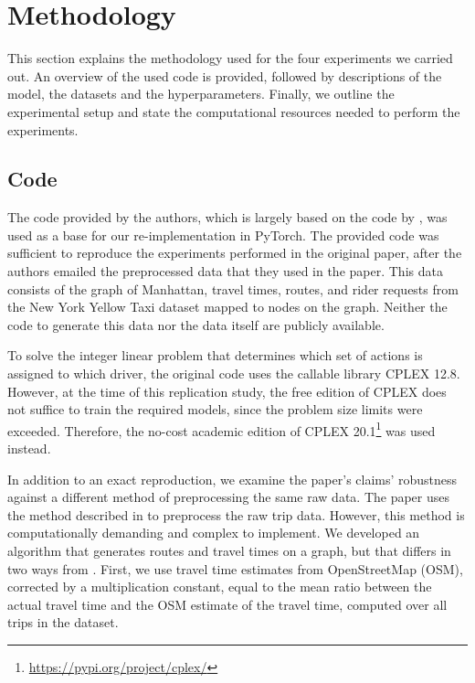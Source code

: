 \section{Methodology}
This section explains the methodology used for the four experiments we carried out.
An overview of the used code is provided, followed by descriptions of the model, the datasets and the hyperparameters. Finally, we outline the experimental setup and state the computational resources needed to perform the experiments.


\subsection{Code}
\label{sec:code}
The code provided by the authors, which is largely based on the code by \cite{shah_neural_2019}, was used as a base for our re-implementation in PyTorch. The provided code was sufficient to reproduce the experiments performed in the original paper, after the authors emailed the preprocessed data that they used in the paper. This data consists of the graph of Manhattan, travel times, routes, and rider requests from the New York Yellow Taxi dataset mapped to nodes on the graph. Neither the code to generate this data nor the data itself are publicly available.

To solve the integer linear problem that determines which set of actions is assigned to which driver, the original code uses the callable library CPLEX 12.8. However, at the time of this replication study, the free edition of CPLEX does not suffice to train the required models, since the problem size limits were exceeded. Therefore, the no-cost academic edition of CPLEX 20.1\footnote{\url{https://pypi.org/project/cplex/}} was used instead.

In addition to an exact reproduction, we examine the paper's claims' robustness against a different method of preprocessing the same raw data. The paper uses the method described in \cite{santi_quantifying_2014} to preprocess the raw trip data. However, this method is computationally demanding and complex to implement. We developed an algorithm that generates routes and travel times on a graph, but that differs in two ways from \cite{santi_quantifying_2014}. First, we use travel time estimates from OpenStreetMap (OSM), corrected by a multiplication constant, equal to the mean ratio between the actual travel time and the OSM estimate of the travel time, computed over all trips in the dataset.

